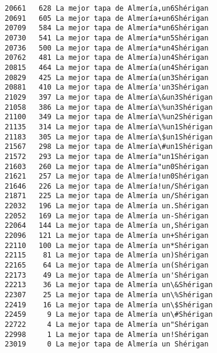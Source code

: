 \documentclass[11pt]{article}
\begin{document}
\begin{Verbatim}[commandchars=\\\{\}]
20661   628 La mejor tapa de Almería,un6Shérigan
20691   605 La mejor tapa de Almería+un6Shérigan
20709   584 La mejor tapa de Almería*un6Shérigan
20730   541 La mejor tapa de Almería*un5Shérigan
20736   500 La mejor tapa de Almería*un4Shérigan
20762   481 La mejor tapa de Almería)un4Shérigan
20815   464 La mejor tapa de Almería(un4Shérigan
20829   425 La mejor tapa de Almería(un3Shérigan
20881   410 La mejor tapa de Almería'un3Shérigan
21029   397 La mejor tapa de Almería\&un3Shérigan
21058   386 La mejor tapa de Almería\%un3Shérigan
21100   349 La mejor tapa de Almería\%un2Shérigan
21135   314 La mejor tapa de Almería\%un1Shérigan
21183   305 La mejor tapa de Almería\$un1Shérigan
21567   298 La mejor tapa de Almería\#un1Shérigan
21572   293 La mejor tapa de Almería"un1Shérigan
21603   260 La mejor tapa de Almería"un0Shérigan
21621   257 La mejor tapa de Almería!un0Shérigan
21646   226 La mejor tapa de Almería!un/Shérigan
21871   225 La mejor tapa de Almería un/Shérigan
22032   196 La mejor tapa de Almería un.Shérigan
22052   169 La mejor tapa de Almería un-Shérigan
22064   144 La mejor tapa de Almería un,Shérigan
22096   121 La mejor tapa de Almería un+Shérigan
22110   100 La mejor tapa de Almería un*Shérigan
22115    81 La mejor tapa de Almería un)Shérigan
22165    64 La mejor tapa de Almería un(Shérigan
22173    49 La mejor tapa de Almería un'Shérigan
22213    36 La mejor tapa de Almería un\&Shérigan
22307    25 La mejor tapa de Almería un\%Shérigan
22419    16 La mejor tapa de Almería un\$Shérigan
22459     9 La mejor tapa de Almería un\#Shérigan
22722     4 La mejor tapa de Almería un"Shérigan
22998     1 La mejor tapa de Almería un!Shérigan
23019     0 La mejor tapa de Almería un Shérigan

    \end{Verbatim}
\end{document}
